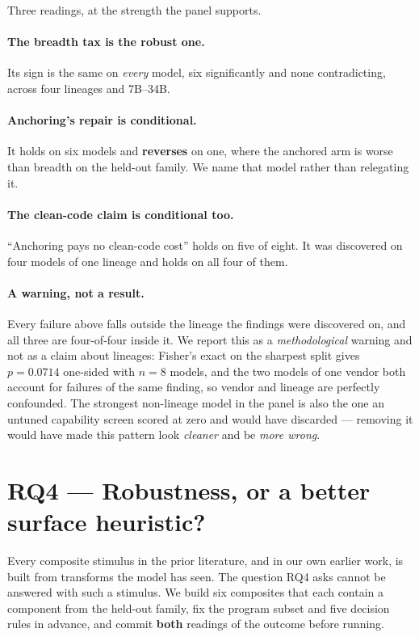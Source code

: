 \documentclass[sigconf,review,anonymous]{acmart}
\begin{document}
Three readings, at the strength the panel supports.

\paragraph{The breadth tax is the robust one.} Its sign is the same on \emph{every} model, six
significantly and none contradicting, across four lineages and 7B--34B.

\paragraph{Anchoring's repair is conditional.} It holds on six models and \textbf{reverses} on one,
where the anchored arm is worse than breadth on the held-out family. We name that model rather than
relegating it.

\paragraph{The clean-code claim is conditional too.} ``Anchoring pays no clean-code cost'' holds on
five of eight. It was discovered on four models of one lineage and holds on all four of them.

\paragraph{A warning, not a result.} Every failure above falls outside the lineage the findings were
discovered on, and all three are four-of-four inside it. We report this as a \emph{methodological}
warning and not as a claim about lineages: Fisher's exact on the sharpest split gives $p=0.0714$
one-sided with $n=8$ models, and the two models of one vendor both account for failures of the same
finding, so vendor and lineage are perfectly confounded. The strongest non-lineage model in the
panel is also the one an untuned capability screen scored at zero and would have discarded ---
removing it would have made this pattern look \emph{cleaner} and be \emph{more wrong}.

\section{RQ4 --- Robustness, or a better surface heuristic?}
\label{sec:rq4}

Every composite stimulus in the prior literature, and in our own earlier work, is built from
transforms the model has seen. The question RQ4 asks cannot be answered with such a stimulus. We
build six composites that each contain a component from the held-out family, fix the program subset
and five decision rules in advance, and commit \textbf{both} readings of the outcome before running.
\end{document}
